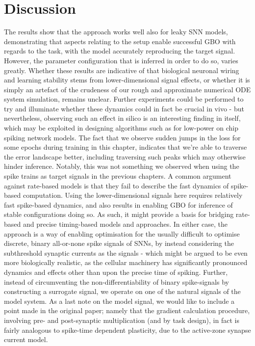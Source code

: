 \documentclass[mphil,deptreport,ianc]{infthesis} %
\begin{document}
\section{Discussion}

The results show that the approach works well also for leaky SNN models, demonstrating that aspects relating to the setup enable successful GBO with regards to the task, with the model accurately reproducing the target signal.
However, the parameter configuration that is inferred in order to do so, varies greatly.
Whether these results are indicative of that biological neuronal wiring and learning stability stems from lower-dimensional signal effects, or whether it is simply an artefact of the crudeness of our rough and approximate numerical ODE system simulation, remains unclear.
Further experiments could be performed to try and illuminate whether these dynamics could in fact be crucial in vivo - but nevertheless, observing such an effect in silico is an interesting finding in itself, which may be exploited in designing algorithms such as for low-power on chip spiking network models.
The fact that we observe sudden jumps in the loss for some epochs during training in this chapter, indicates that we're able to traverse the error landscape better, including traversing such peaks which may otherwise hinder inference.
Notably, this was not something we observed when using the spike trains as target signals in the previous chapters.
A common argument against rate-based models is that they fail to describe the fast dynamics of spike-based computation.
Using the lower-dimensional signals here requires relatively fast spike-based dynamics, and also results in enabling GBO for inference of stable configurations doing so.
As such, it might provide a basis for bridging rate-based and precise timing-based models and approaches.
In either case, the approach is a way of enabling optimisation for the usually difficult to optimise discrete, binary all-or-none spike signals of SNNs, by instead considering the subthreshold synaptic currents as the signals - which might be argued to be even more biologically realistic, as the cellular machinery has significantly pronounced dynamics and effects other than upon the precise time of spiking.
Further, instead of circumventing the non-differentiability of binary spike-signals by constructing a surrogate signal, we operate on one of the natural signals of the model system.
As a last note on the model signal, we would like to include a point made in the original paper; namely that the gradient calculation procedure, involving pre- and post-synaptic multiplication (and by task design), in fact is fairly analogous to spike-time dependent plasticity, due to the active-zone synapse current model.
\end{document}
